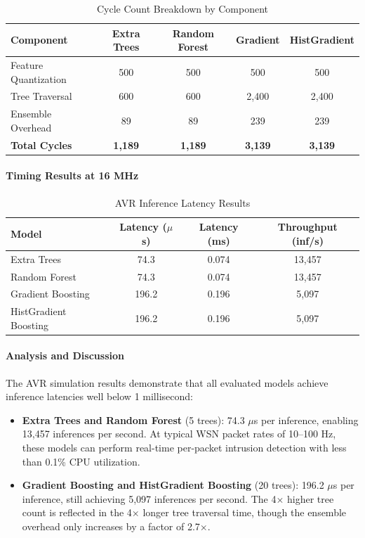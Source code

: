 \begin{table}[htbp]
\centering
\caption{Cycle Count Breakdown by Component}
\label{tab:avr_cycles}
\begin{tabular}{lcccc}
\hline
\textbf{Component} & \textbf{Extra Trees} & \textbf{Random Forest} & \textbf{Gradient} & \textbf{HistGradient} \\
\hline
Feature Quantization & 500 & 500 & 500 & 500 \\
Tree Traversal & 600 & 600 & 2,400 & 2,400 \\
Ensemble Overhead & 89 & 89 & 239 & 239 \\
\textbf{Total Cycles} & \textbf{1,189} & \textbf{1,189} & \textbf{3,139} & \textbf{3,139} \\
\hline
\end{tabular}
\end{table}

\paragraph{Timing Results at 16 MHz}

\begin{table}[htbp]
\centering
\caption{AVR Inference Latency Results}
\label{tab:avr_latency}
\begin{tabular}{lccc}
\hline
\textbf{Model} & \textbf{Latency ($\mu$s)} & \textbf{Latency (ms)} & \textbf{Throughput (inf/s)} \\
\hline
Extra Trees & 74.3 & 0.074 & 13,457 \\
Random Forest & 74.3 & 0.074 & 13,457 \\
Gradient Boosting & 196.2 & 0.196 & 5,097 \\
HistGradient Boosting & 196.2 & 0.196 & 5,097 \\
\hline
\end{tabular}
\end{table}

\paragraph{Analysis and Discussion}

The AVR simulation results demonstrate that all evaluated models achieve inference latencies well below 1 millisecond:

\begin{itemize}
    \item \textbf{Extra Trees and Random Forest} (5 trees): 74.3 $\mu$s per inference, enabling 13,457 inferences per second. At typical WSN packet rates of 10--100 Hz, these models can perform real-time per-packet intrusion detection with less than 0.1\% CPU utilization.
    
    \item \textbf{Gradient Boosting and HistGradient Boosting} (20 trees): 196.2 $\mu$s per inference, still achieving 5,097 inferences per second. The 4$\times$ higher tree count is reflected in the 4$\times$ longer tree traversal time, though the ensemble overhead only increases by a factor of 2.7$\times$.
\end{itemize}

